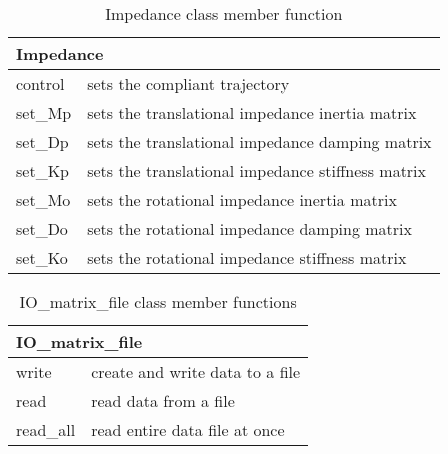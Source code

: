 \documentclass[dvips,11pt,fleqn]{report}
\begin{document}
\begin{table}[htbp]
\caption{Impedance class member function}
\label{tab:commandsum1h}
\begin{center}
\begin{tabular}{||l|l||}
\hline
\hline
\multicolumn{2}{||l||}{{\bf Impedance}} \\
\hline
\hline
control & sets the compliant trajectory \\
\hline
set\_Mp & sets the translational impedance inertia matrix \\
\hline
set\_Dp & sets the translational impedance damping matrix \\
\hline
set\_Kp & sets the translational impedance stiffness matrix \\
\hline
set\_Mo & sets the rotational impedance inertia matrix \\
\hline
set\_Do & sets the rotational impedance damping matrix \\
\hline
set\_Ko & sets the rotational impedance stiffness matrix \\
\hline
\end{tabular}
\end{center}
\end{table}

\begin{table}[htbp]
\caption{IO\_matrix\_file class member functions}
\label{tab:commandsum1i}
\begin{center}
\begin{tabular}{||l|l||}
\hline
\hline
\multicolumn{2}{||l||}{{\bf IO\_matrix\_file}} \\
\hline
\hline
write & create and write data to a file \\
\hline
read & read data from a file  \\
\hline
read\_all & read entire data file at once \\
\hline
\end{tabular}
\end{center}
\end{table}
\end{document}
